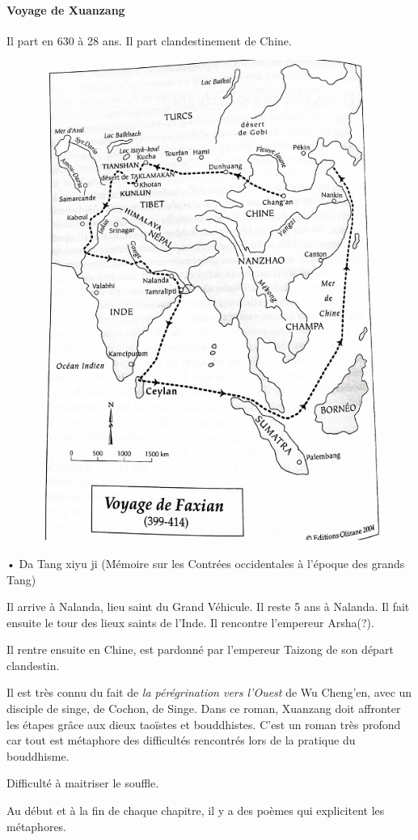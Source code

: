 \paragraph{Voyage de Xuanzang}
 Il part en 630 à 28 ans. Il part clandestinement de Chine.
 

\begin{figure}[!h]
    \centering
    \includegraphics[width=.4\textwidth]{ConfucianismeTaoismeBouddhismeChinois/XuanzangInde.jpg}

    \label{fig:enter-label}
\end{figure}
•	Da Tang xiyu ji (Mémoire sur les Contrées occidentales à l’époque des grands Tang)

Il arrive à Nalanda, lieu saint du Grand Véhicule.
Il reste 5 ans à Nalanda. Il fait ensuite le tour des lieux saints de l'Inde. Il rencontre l'empereur Arsha(?).

Il rentre ensuite en Chine, est pardonné par l'empereur Taizong de son départ clandestin. 

\begin{Prop}
    Il est très connu du fait de \textit{la pérégrination vers l'Ouest } de Wu Cheng'en, avec un disciple de singe, de Cochon, de Singe. Dans ce roman, Xuanzang doit affronter les étapes grâce aux dieux taoïstes et bouddhistes. C'est un roman très profond car tout est métaphore des difficultés rencontrés lors de la pratique du bouddhisme.
\end{Prop}

\begin{Ex}
    Difficulté à maitriser le souffle.
\end{Ex}

Au début et à la fin de chaque chapitre, il y a des poèmes qui explicitent les métaphores.

